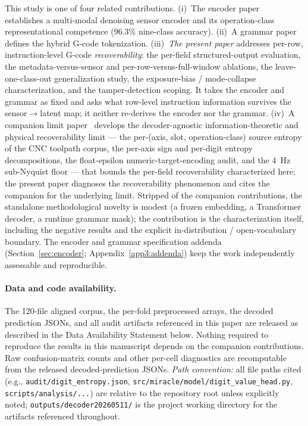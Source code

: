 \documentclass[sensors,article,submit,moreauthors,pdftex]{Definitions/mdpi}
\begin{document}
This study is one of four related contributions. (i)~The encoder paper~\cite{encoder_paper} establishes a multi-modal denoising sensor encoder and its operation-class representational competence ($96.3\%$ nine-class accuracy). (ii)~A grammar paper~\cite{grammar_paper} defines the hybrid G-code tokenization. (iii)~\emph{The present paper} addresses per-row, instruction-level G-code \emph{recoverability}: the per-field structured-output evaluation, the metadata-versus-sensor and per-row-versus-full-window ablations, the leave-one-class-out generalization study, the exposure-bias / mode-collapse characterization, and the tamper-detection scoping. It takes the encoder and grammar as fixed and asks what row-level instruction information survives the sensor$\rightarrow$latent map; it neither re-derives the encoder nor the grammar. (iv)~A companion limit paper~\cite{paperB_entropy} develops the decoder-agnostic information-theoretic and physical recoverability limit --- the per-(axis, slot, operation-class) source entropy of the CNC toolpath corpus, the per-axis sign and per-digit entropy decompositions, the float-epsilon numeric-target-encoding audit, and the 4~Hz sub-Nyquist floor --- that bounds the per-field recoverability characterized here; the present paper diagnoses the recoverability phenomenon and cites the companion for the underlying limit. Stripped of the companion contributions, the standalone methodological novelty is modest (a frozen embedding, a Transformer decoder, a runtime grammar mask); the contribution is the characterization itself, including the negative results and the explicit in-distribution / open-vocabulary boundary. The encoder and grammar specification addenda (Section~\ref{sec:encoder}; Appendix~\ref{app3:addenda}) keep the work independently assessable and reproducible.

\paragraph{Data and code availability.} The 120-file aligned corpus, the per-fold preprocessed arrays, the decoded prediction JSONs, and all audit artifacts referenced in this paper are released as described in the Data Availability Statement below. Nothing required to reproduce the results in this manuscript depends on the companion contributions. Raw confusion-matrix counts and other per-cell diagnostics are recomputable from the released decoded-prediction JSONs. \emph{Path convention:} all file paths cited (e.g., \texttt{audit/digit\_entropy.json}, \texttt{src/miracle/model/digit\_value\_head.py}, \texttt{scripts/analysis/...}) are relative to the repository root unless explicitly noted; \texttt{outputs/decoder20260511/} is the project working directory for the artifacts referenced throughout.
\end{document}
